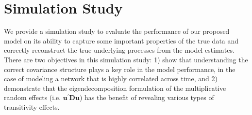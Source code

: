 \documentclass[a4paper]{article}
\begin{document}
\section{Simulation Study}\label{sec: simulation study}
We provide a simulation study to evaluate the performance of our proposed model on its ability to capture some important properties of the true data and correctly reconstruct the true underlying processes from the model estimates. There are two objectives in this simulation study: 1) show that understanding the correct covariance structure plays a key role in the model performance, in the case of modeling a network that is highly correlated across time, and 2) demonstrate that the eigendecomposition formulation of the multiplicative random effects (i.e. $\boldsymbol{u}^\prime \mathbf{D}\boldsymbol{u}$) has the benefit of revealing various types of transitivity effects.
\end{document}

